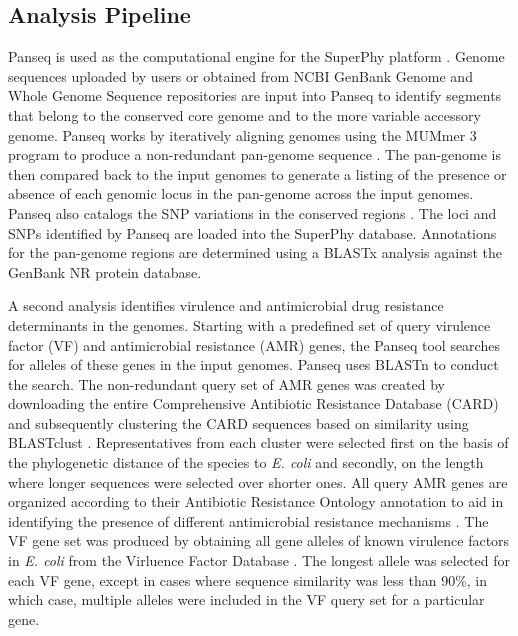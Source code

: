 \documentclass[a4paper,twoside]{article}
\begin{document}
\subsection{Analysis Pipeline}
\label{sec:pipeline}

Panseq is used as the computational engine for the SuperPhy platform \cite{laing_pan-genome_2010}. Genome sequences uploaded by users or obtained from NCBI GenBank Genome and Whole Genome Sequence repositories \cite{benson2013genbank} are input into Panseq to identify segments that belong to the conserved core genome and to the more variable accessory genome. Panseq works by iteratively aligning genomes using the MUMmer 3 program to produce a non-redundant pan-genome sequence \cite{laing_pan-genome_2010,kurtz2004versatile}. The pan-genome is then compared back to the input genomes to generate a listing of the presence or absence of each genomic locus in the pan-genome across the input genomes. Panseq also catalogs the SNP variations in the conserved regions \cite{laing_pan-genome_2010}.  The loci and SNPs identified by Panseq are loaded into the SuperPhy database. Annotations for the pan-genome regions are determined using a BLASTx analysis against the GenBank NR protein database.

A second analysis identifies virulence and antimicrobial drug resistance determinants in the genomes. Starting with a predefined set of query virulence factor (VF) and antimicrobial resistance (AMR) genes, the Panseq tool searches for alleles of these genes in the input genomes. Panseq uses BLASTn to conduct the search. The non-redundant query set of AMR genes was created by downloading the entire Comprehensive Antibiotic Resistance Database (CARD) \cite{mcarthur2012card} and subsequently clustering the CARD sequences based on similarity using BLASTclust \cite{altschul_gapped_1997}. Representatives from each cluster were selected first on the basis of the phylogenetic distance of the species to \textit{E. coli} and secondly, on the length where longer sequences were selected over shorter ones. All query AMR genes are organized according to their Antibiotic Resistance Ontology annotation to aid in identifying the presence of different antimicrobial resistance mechanisms \cite{antezana_biological_2009}. The VF gene set was produced by obtaining all gene alleles of known virulence factors in \textit{E. coli} from the Virluence Factor Database \cite{chen2012vfdb,chen2005vfdb}.  The longest allele was selected for each VF gene, except in cases where sequence similarity was less than 90\%, in which case, multiple alleles were included in the VF query set for a particular gene.
\end{document}
